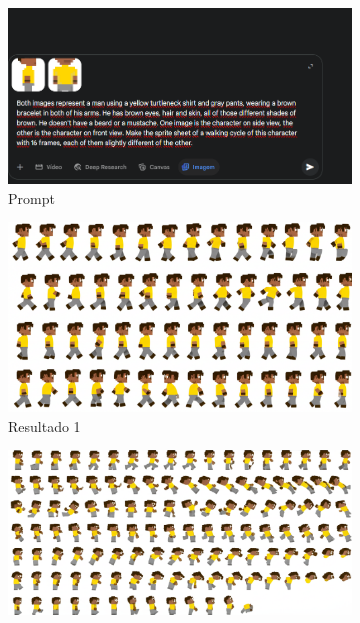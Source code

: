 \begin{figure}[htbp]
    \centering
    \caption{\small Processo da geração 3 do sprite sheet no Gemini Pro em julho/2025}
    \label{fig:geminiProSheet3}

    \begin{subfigure}{0.9\linewidth}
        \includegraphics[width=1\linewidth]{figs/geminiPro/chat9/tela1.PNG}
        \caption{\small Prompt}
        \label{fig:geminiProSheet3Prompt}
    \end{subfigure}
    \begin{subfigure}{0.3\linewidth}
        \includegraphics[width=1\linewidth]{figs/geminiPro/chat9/1res1.PNG}
        \caption{\small Resultado 1}
        \label{fig:geminiProSheet3a}
    \end{subfigure}
    \begin{subfigure}{0.3\linewidth}
        \includegraphics[width=1\linewidth]{figs/geminiPro/chat9/1res2.PNG}

\end{subfigure}
\end{figure}
